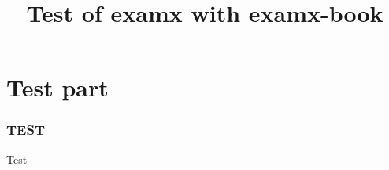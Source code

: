 \documentclass{examx}
\title{Test of examx with examx-book}
\begin{document}
    \part{Test part}
    \section{TEST}
    Test
\end{document}

